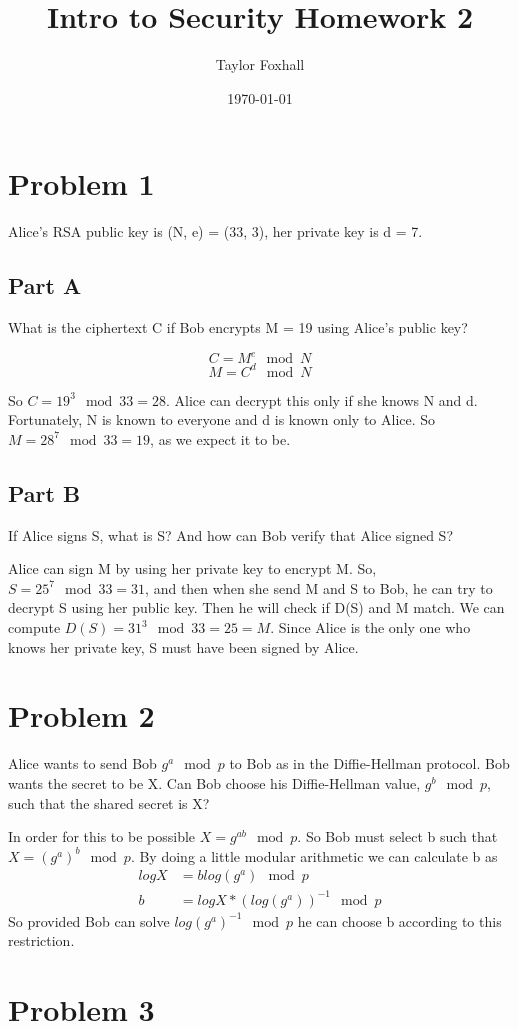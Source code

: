 \documentclass[12pt,letterpaper]{article}
\author{Taylor Foxhall}
\date{\today}
\title{Intro to Security Homework 2}
\begin{document}
\maketitle
\section{Problem 1}
\label{sec-1}
Alice's RSA public key is (N, e) = (33, 3), her private key is d
= 7.
\subsection{Part A}
\label{sec-1-1}
What is the ciphertext C if Bob encrypts M = 19 using Alice's
public key?

$$ C = M^e \mod N $$
$$ M = C^d \mod N $$

So $C = 19^3 \mod 33 = 28$. Alice can decrypt this only if she
knows N and d. Fortunately, N is known to everyone and d is known
only to Alice. So $M = 28^7 \mod 33 = 19$, as we expect it to be.
\subsection{Part B}
\label{sec-1-2}
If Alice signs S, what is S? And how can Bob verify that Alice
signed S?

Alice can sign M by using her private key to encrypt M. So, $S =
   25^7 \mod 33 = 31$, and then when she send M and S to Bob, he can
try to decrypt S using her public key. Then he will check if D(S)
and M match. We can compute $D(S) = 31^3 \mod 33 = 25 = M$. Since
Alice is the only one who knows her private key, S must have been
signed by Alice.
\section{Problem 2}
\label{sec-2}
Alice wants to send Bob $g^a \mod p$ to Bob as in the Diffie-Hellman
protocol. Bob wants the secret to be X. Can Bob choose his
Diffie-Hellman value, $g^b \mod p$, such that the shared secret is
X?

In order for this to be possible $X = g^{ab} \mod p$. So Bob must
select b such that $X = (g^a)^b \mod p$. By doing a little modular
arithmetic we can calculate b as
\begin{align*}
logX &= blog(g^a) \mod p \\
b &= logX * (log(g^a))^{-1} \mod p
\end{align*}
So provided Bob can solve $log(g^a)^{-1} \mod p$ he can choose b
according to this restriction.
\section{Problem 3}
\label{sec-3}
\end{document}
